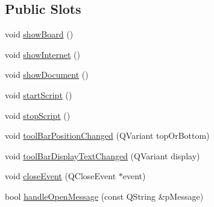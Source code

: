 \subsection*{Public Slots}
\begin{DoxyCompactItemize}
\item 
void \hyperlink{class_u_b_application_a102c14ccc28c9fff1a2b1761f14d5394}{show\-Board} ()
\item 
void \hyperlink{class_u_b_application_a6c4f0ddf3e03657de74ed16fd6aac820}{show\-Internet} ()
\item 
void \hyperlink{class_u_b_application_aa7760534852820a497c88484745d8225}{show\-Document} ()
\item 
void \hyperlink{class_u_b_application_ad9aa6585bf12b146140fb6ac6e95afb6}{start\-Script} ()
\item 
void \hyperlink{class_u_b_application_affcb7f1a1f6bec9a060776ec95bdaa59}{stop\-Script} ()
\item 
void \hyperlink{class_u_b_application_aded2a4d2d897e72822dc1559bb4f2deb}{tool\-Bar\-Position\-Changed} (Q\-Variant top\-Or\-Bottom)
\item 
void \hyperlink{class_u_b_application_a1841788fb029676a963d444c9b1bcf24}{tool\-Bar\-Display\-Text\-Changed} (Q\-Variant display)
\item 
void \hyperlink{class_u_b_application_a3430ce2c83e60df4fb78fc88aa53531e}{close\-Event} (Q\-Close\-Event $\ast$event)
\item 
bool \hyperlink{class_u_b_application_adf778486cf90f2d7d5ac3b98a56430b7}{handle\-Open\-Message} (const Q\-String \&p\-Message)
\end{DoxyCompactItemize}
